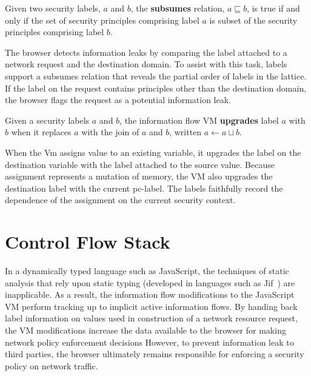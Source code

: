 \begin{definition}
  Given two security labels, $a$ and $b$, the {\bf subsumes} relation, $a \sqsubseteq b$, is true if and only if the set of security principles comprising label $a$ is subset of the security principles comprising label $b$.
\end{definition}

The browser detects information leaks by comparing the label attached to a network request and the destination domain.
To assist with this task, labels support a subsumes relation that reveals the partial order of labels in the lattice.
If the label on the request contains principles other than the destination domain, the browser flags the request as a potential information leak.

\begin{definition}
  Given a security labels $a$ and $b$, the information flow VM {\bf upgrades} label $a$ with $b$ when it replaces $a$ with the join of $a$ and $b$, written $a \gets a \sqcup b$.
\end{definition}

When the Vm assigns value to an existing variable, it upgrades the label on the destination variable with the label attached to the source value.
Because assignment represents a mutation of memory, the VM also upgrades the destination label with the current pc-label.
The labels faithfully record the dependence of the assignment on the current security context.


\section{Control Flow Stack}
\label{sec:control-flow-stack}

In a dynamically typed language such as JavaScript, the techniques of static analysis that rely upon static typing (developed in languages such as Jif~\cite{jif}) are inapplicable.
As a result, the information flow modifications to the JavaScript VM perform tracking up to implicit active information flows.
By handing back label information on values used in construction of a network resource request, the VM modifications increase the data available to the browser for making network policy enforcement decisions 
However, to prevent information leak to third parties, the browser ultimately remains responsible for enforcing a security policy on network traffic.

